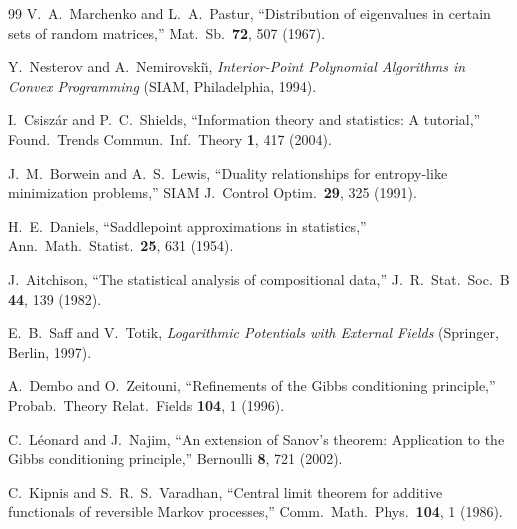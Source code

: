 \documentclass[aps,pre,twocolumn,superscriptaddress,nofootinbib]{revtex4-2}
\theoremstyle{definition}
\theoremstyle{remark}
\begin{document}
\begin{thebibliography}{99}
V.~A.~Marchenko and L.~A.~Pastur, ``Distribution of eigenvalues in certain
sets of random matrices,'' Mat.\ Sb.\ \textbf{72}, 507 (1967).

Y.~Nesterov and A.~Nemirovski{\u\i}, \emph{Interior-Point Polynomial
Algorithms in Convex Programming} (SIAM, Philadelphia, 1994).

I.~Csisz\'{a}r and P.~C.~Shields, ``Information theory and statistics: A
tutorial,'' Found.\ Trends Commun.\ Inf.\ Theory \textbf{1}, 417 (2004).

J.~M.~Borwein and A.~S.~Lewis, ``Duality relationships for entropy-like
minimization problems,'' SIAM J.\ Control Optim.\ \textbf{29}, 325 (1991).

H.~E.~Daniels, ``Saddlepoint approximations in statistics,'' Ann.\ Math.\
Statist.\ \textbf{25}, 631 (1954).

J.~Aitchison, ``The statistical analysis of compositional data,'' J.\ R.\
Stat.\ Soc.\ B \textbf{44}, 139 (1982).

E.~B.~Saff and V.~Totik, \emph{Logarithmic Potentials with External Fields}
(Springer, Berlin, 1997).

A.~Dembo and O.~Zeitouni, ``Refinements of the Gibbs conditioning principle,''
Probab.\ Theory Relat.\ Fields \textbf{104}, 1 (1996).

C.~L\'{e}onard and J.~Najim, ``An extension of Sanov's theorem: Application
to the Gibbs conditioning principle,'' Bernoulli \textbf{8}, 721 (2002).

\bibitem{KipnisVaradhan1986}
C.~Kipnis and S.~R.~S.~Varadhan, ``Central limit theorem for additive
functionals of reversible Markov processes,'' Comm.\ Math.\ Phys.\
\textbf{104}, 1 (1986).

\end{thebibliography}
\end{document}
